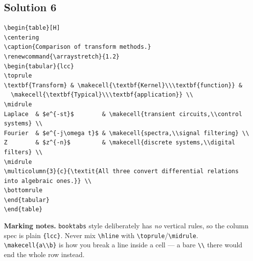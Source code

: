 \documentclass[11pt]{article}
\begin{document}
\subsection*{Solution 6}
\begin{lstlisting}[style=tex]
\begin{table}[H]
\centering
\caption{Comparison of transform methods.}
\renewcommand{\arraystretch}{1.2}
\begin{tabular}{lcc}
\toprule
\textbf{Transform} & \makecell{\textbf{Kernel}\\\textbf{function}} &
  \makecell{\textbf{Typical}\\\textbf{application}} \\
\midrule
Laplace  & $e^{-st}$        & \makecell{transient circuits,\\control systems} \\
Fourier  & $e^{-j\omega t}$ & \makecell{spectra,\\signal filtering} \\
Z        & $z^{-n}$         & \makecell{discrete systems,\\digital filters} \\
\midrule
\multicolumn{3}{c}{\textit{All three convert differential relations into algebraic ones.}} \\
\bottomrule
\end{tabular}
\end{table}
\end{lstlisting}
\textbf{Marking notes.} \texttt{booktabs} style deliberately has \emph{no}
vertical rules, so the column spec is plain \verb|{lcc}|. Never mix
\verb|\hline| with \verb|\toprule|/\verb|\midrule|. \verb|\makecell{a\\b}|
is how you break a line inside a cell --- a bare \verb|\\| there would end
the whole row instead.

\end{document}
